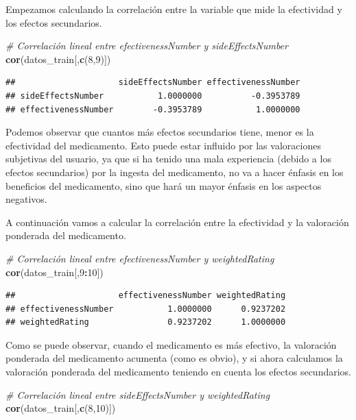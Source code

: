 \documentclass[spanish,]{article}
\newenvironment{Shaded}{\begin{snugshade}}{\end{snugshade}}
\newcommand{\KeywordTok}[1]{\textcolor[rgb]{0.13,0.29,0.53}{\textbf{#1}}}
\newcommand{\DecValTok}[1]{\textcolor[rgb]{0.00,0.00,0.81}{#1}}
\newcommand{\CommentTok}[1]{\textcolor[rgb]{0.56,0.35,0.01}{\textit{#1}}}
\newcommand{\OperatorTok}[1]{\textcolor[rgb]{0.81,0.36,0.00}{\textbf{#1}}}
\newcommand{\NormalTok}[1]{#1}
\begin{document}
Empezamos calculando la correlación entre la variable que mide la
efectividad y los efectos secundarios.

\begin{Shaded}
\begin{Highlighting}[]
\CommentTok{# Correlación lineal entre efectivenessNumber y sideEffectsNumber}
\KeywordTok{cor}\NormalTok{(datos_train[,}\KeywordTok{c}\NormalTok{(}\DecValTok{8}\NormalTok{,}\DecValTok{9}\NormalTok{)])}
\end{Highlighting}
\end{Shaded}

\begin{verbatim}
##                     sideEffectsNumber effectivenessNumber
## sideEffectsNumber           1.0000000          -0.3953789
## effectivenessNumber        -0.3953789           1.0000000
\end{verbatim}

Podemos observar que cuantos más efectos secundarios tiene, menor es la
efectividad del medicamento. Esto puede estar influido por las
valoraciones subjetivas del usuario, ya que si ha tenido una mala
experiencia (debido a los efectos secundarios) por la ingesta del
medicamento, no va a hacer énfasis en los beneficios del medicamento,
sino que hará un mayor énfasis en los aspectos negativos.

A continuación vamos a calcular la correlación entre la efectividad y la
valoración ponderada del medicamento.

\begin{Shaded}
\begin{Highlighting}[]
\CommentTok{# Correlación lineal entre efectivenessNumber y weightedRating}
\KeywordTok{cor}\NormalTok{(datos_train[,}\DecValTok{9}\OperatorTok{:}\DecValTok{10}\NormalTok{])}
\end{Highlighting}
\end{Shaded}

\begin{verbatim}
##                     effectivenessNumber weightedRating
## effectivenessNumber           1.0000000      0.9237202
## weightedRating                0.9237202      1.0000000
\end{verbatim}

Como se puede observar, cuando el medicamento es más efectivo, la
valoración ponderada del medicamento acumenta (como es obvio), y si
ahora calculamos la valoración ponderada del medicamento teniendo en
cuenta los efectos secundarios.

\begin{Shaded}
\begin{Highlighting}[]
\CommentTok{# Correlación lineal entre sideEffectsNumber y weightedRating}
\KeywordTok{cor}\NormalTok{(datos_train[,}\KeywordTok{c}\NormalTok{(}\DecValTok{8}\NormalTok{,}\DecValTok{10}\NormalTok{)])}
\end{Highlighting}
\end{Shaded}
\end{document}

